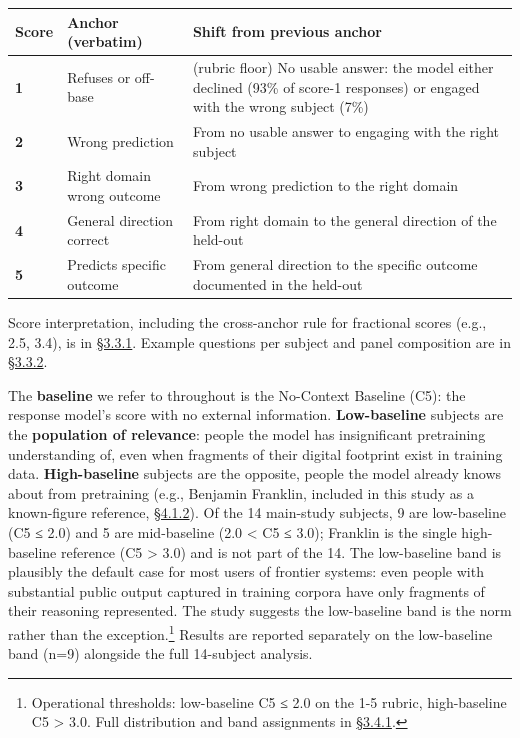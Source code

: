 \begin{longtable}[]{@{}
  >{\raggedright\arraybackslash}p{}
  >{\raggedright\arraybackslash}p{}
  >{\raggedright\arraybackslash}p{}@{}}
\toprule
Score & Anchor (verbatim) & Shift from previous anchor \\
\midrule
\endhead
\textbf{1} & Refuses or off-base & (rubric floor) No usable answer: the
model either declined (93\% of score-1 responses) or engaged with the
wrong subject (7\%) \\
\textbf{2} & Wrong prediction & From no usable answer to engaging with
the right subject \\
\textbf{3} & Right domain wrong outcome & From wrong prediction to the
right domain \\
\textbf{4} & General direction correct & From right domain to the
general direction of the held-out \\
\textbf{5} & Predicts specific outcome & From general direction to the
specific outcome documented in the held-out \\
\bottomrule
\end{longtable}

Score interpretation, including the cross-anchor rule for fractional
scores (e.g., 2.5, 3.4), is in \hyperref[score-interpretation]{§3.3.1}. Example questions per subject and
panel composition are in \hyperref[judge-panel]{§3.3.2}.

The \textbf{baseline} we refer to throughout is the No-Context Baseline
(C5): the response model's score with no external information.
\textbf{Low-baseline} subjects are the \textbf{population of relevance}:
people the model has insignificant pretraining understanding of, even
when fragments of their digital footprint exist in training data.
\textbf{High-baseline} subjects are the opposite, people the model
already knows about from pretraining (e.g., Benjamin Franklin, included
in this study as a known-figure reference, \hyperref[the-gradient-at-the-high-baseline-end-franklin-reference]{§4.1.2}). Of the 14 main-study
subjects, 9 are low-baseline (C5 ≤ 2.0) and 5 are mid-baseline (2.0
\textless{} C5 ≤ 3.0); Franklin is the single high-baseline reference
(C5 \textgreater{} 3.0) and is not part of the 14. The low-baseline band
is plausibly the default case for most users of frontier systems: even
people with substantial public output captured in training corpora have
only fragments of their reasoning represented. The study suggests the
low-baseline band is the norm rather than the exception.\footnote{Operational
  thresholds: low-baseline C5 ≤ 2.0 on the 1-5 rubric, high-baseline C5
  \textgreater{} 3.0. Full distribution and band assignments in \hyperref[pretraining-coverage-variance-high-vs-low-baseline]{§3.4.1}.}
Results are reported separately on the low-baseline band (n=9) alongside
the full 14-subject analysis.

